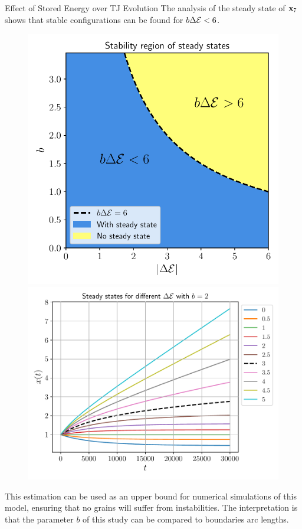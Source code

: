 \documentclass[usenames,dvipsnames]{beamer}
\begin{document}
\begin{frame}{Effect of Stored Energy over TJ Evolution}
The analysis of the steady state of {\color{red} $\x_7$} shows that stable configurations can be found for $b\Delta \mathcal{E} < 6$.
\begin{figure}
\includegraphics[scale=0.38,valign=t, trim={0 0 0 1em}]{figures/stored_energy/SE_stability.pdf}\hfill
\includegraphics[trim={1em 1em 1em 1em}, clip=true,scale=0.38,valign=t]{figures/stored_energy/SE_experiments.pdf}
\end{figure}
This estimation can be used as an upper bound for numerical simulations of this model, ensuring that no grains will suffer from instabilities.
The interpretation is that the parameter $b$ of this study can be compared to boundaries arc lengths.
\end{frame}
\end{document}
